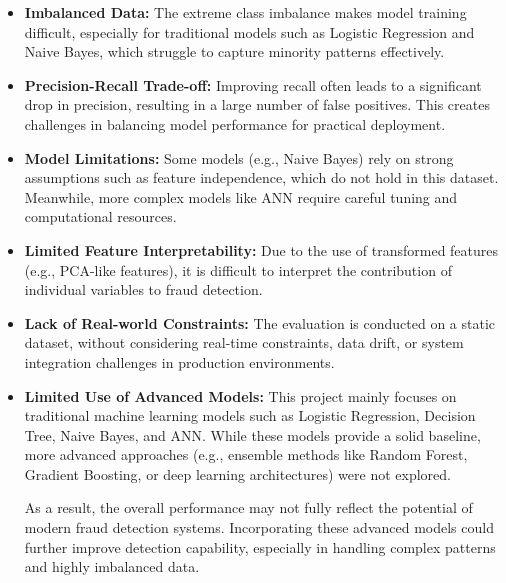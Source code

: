 \begin{itemize}
    \item \textbf{Imbalanced Data:} The extreme class imbalance makes model training difficult, especially for traditional models such as Logistic Regression and Naive Bayes, which struggle to capture minority patterns effectively.

    \item \textbf{Precision-Recall Trade-off:} Improving recall often leads to a significant drop in precision, resulting in a large number of false positives. This creates challenges in balancing model performance for practical deployment.

    \item \textbf{Model Limitations:} Some models (e.g., Naive Bayes) rely on strong assumptions such as feature independence, which do not hold in this dataset. Meanwhile, more complex models like ANN require careful tuning and computational resources.

    \item \textbf{Limited Feature Interpretability:} Due to the use of transformed features (e.g., PCA-like features), it is difficult to interpret the contribution of individual variables to fraud detection.

    \item \textbf{Lack of Real-world Constraints:} The evaluation is conducted on a static dataset, without considering real-time constraints, data drift, or system integration challenges in production environments.

    \item \textbf{Limited Use of Advanced Models:} This project mainly focuses on traditional machine learning models such as Logistic Regression, Decision Tree, Naive Bayes, and ANN. While these models provide a solid baseline, more advanced approaches (e.g., ensemble methods like Random Forest, Gradient Boosting, or deep learning architectures) were not explored.

As a result, the overall performance may not fully reflect the potential of modern fraud detection systems. Incorporating these advanced models could further improve detection capability, especially in handling complex patterns and highly imbalanced data.
\end{itemize}